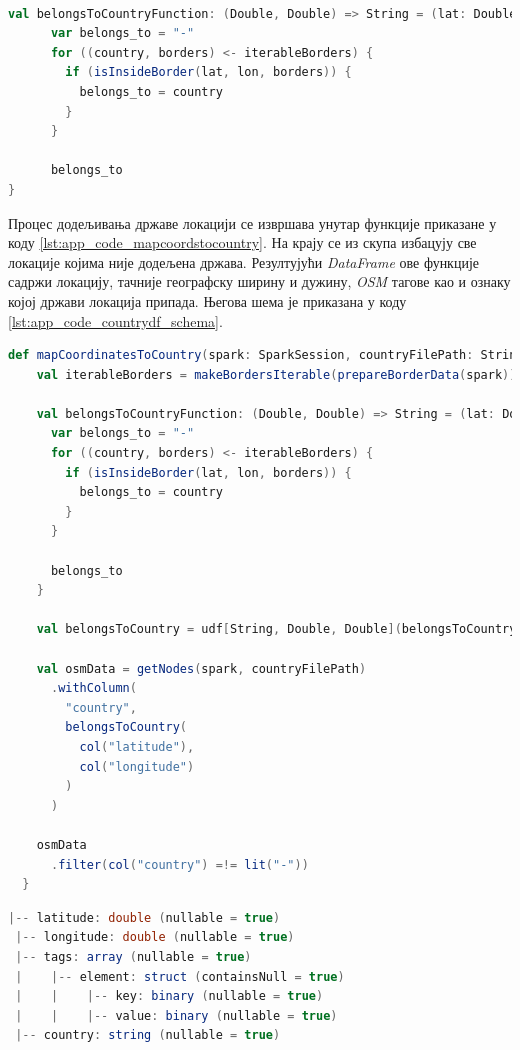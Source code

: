 \documentclass[12pt,oneside]{memoir}
\begin{document}
\begin{lstlisting}[caption={Функција која додељује државу локацији}, language=Scala, label={lst:app_code_belongstocountry}]

val belongsToCountryFunction: (Double, Double) => String = (lat: Double, lon: Double) => {
      var belongs_to = "-"
      for ((country, borders) <- iterableBorders) {
        if (isInsideBorder(lat, lon, borders)) {
          belongs_to = country
        }
      }

      belongs_to
}
\end{lstlisting}

Процес додељивања државе локацији се извршава унутар функције приказане у коду \ref{lst:app_code_mapcoordstocountry}. На крају се из скупа избацују све локације којима није додељена држава. Резултујући \textit{DataFrame} ове функције садржи локацију, тачније географску ширину и дужину, \textit{OSM} тагове као и ознаку којој држави локација припада. Његова шема је приказана у коду \ref{lst:app_code_countrydf_schema}.

\begin{lstlisting}[caption={Функција \textit{mapCoordinatesToCountry}}, language=Scala, label={lst:app_code_mapcoordstocountry}]
def mapCoordinatesToCountry(spark: SparkSession, countryFilePath: String): DataFrame = {
    val iterableBorders = makeBordersIterable(prepareBorderData(spark))

    val belongsToCountryFunction: (Double, Double) => String = (lat: Double, lon: Double) => {
      var belongs_to = "-"
      for ((country, borders) <- iterableBorders) {
        if (isInsideBorder(lat, lon, borders)) {
          belongs_to = country
        }
      }

      belongs_to
    }

    val belongsToCountry = udf[String, Double, Double](belongsToCountryFunction)

    val osmData = getNodes(spark, countryFilePath)
      .withColumn(
        "country",
        belongsToCountry(
          col("latitude"),
          col("longitude")
        )
      )

    osmData
      .filter(col("country") =!= lit("-"))
  }
\end{lstlisting}

\begin{lstlisting}[caption={Шема \textit{DataFrame}-а након додељивања држава локацијама}, language=Scala, label={lst:app_code_countrydf_schema}]
 |-- latitude: double (nullable = true)
 |-- longitude: double (nullable = true)
 |-- tags: array (nullable = true)
 |    |-- element: struct (containsNull = true)
 |    |    |-- key: binary (nullable = true)
 |    |    |-- value: binary (nullable = true)
 |-- country: string (nullable = true)
\end{lstlisting}
\end{document}
